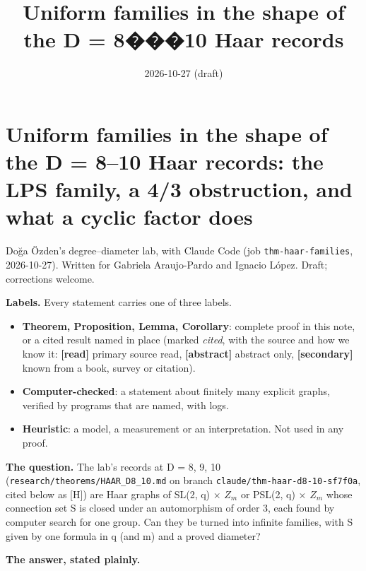\documentclass[
  10pt,
]{article}
\title{Uniform families in the shape of the D = 8���10 Haar records}
\author{}
\date{2026-10-27 (draft)}
\providecommand{\tightlist}{%
  \setlength{\itemsep}{0pt}\setlength{\parskip}{0pt}}
\begin{document}
\maketitle

\hypertarget{uniform-families-in-the-shape-of-the-d-810-haar-records-the-lps-family-a-43-obstruction-and-what-a-cyclic-factor-does}{%
\section{Uniform families in the shape of the D = 8--10 Haar records:
the LPS family, a 4/3 obstruction, and what a cyclic factor
does}\label{uniform-families-in-the-shape-of-the-d-810-haar-records-the-lps-family-a-43-obstruction-and-what-a-cyclic-factor-does}}

Doğa Özden's degree--diameter lab, with Claude Code (job
\texttt{thm-haar-families}, 2026-10-27). Written for Gabriela
Araujo-Pardo and Ignacio López. Draft; corrections welcome.

\textbf{Labels.} Every statement carries one of three labels.

\begin{itemize}
\tightlist
\item
  \textbf{Theorem, Proposition, Lemma, Corollary}: complete proof in
  this note, or a cited result named in place (marked \emph{cited}, with
  the source and how we know it: \textbf{{[}read{]}} primary source
  read, \textbf{{[}abstract{]}} abstract only, \textbf{{[}secondary{]}}
  known from a book, survey or citation).
\item
  \textbf{Computer-checked}: a statement about finitely many explicit
  graphs, verified by programs that are named, with logs.
\item
  \textbf{Heuristic}: a model, a measurement or an interpretation. Not
  used in any proof.
\end{itemize}

\textbf{The question.} The lab's records at D = 8, 9, 10
(\texttt{research/theorems/HAAR\_D8\_10.md} on branch
\texttt{claude/thm-haar-d8-10-sf7f0a}, cited below as {[}H{]}) are Haar
graphs of SL(2, q) × \(Z_{m}\) or PSL(2, q) × \(Z_{m}\) whose connection
set S is closed under an automorphism of order 3, each found by computer
search for one group. Can they be turned into infinite families, with S
given by one formula in q (and m) and a proved diameter?

\textbf{The answer, stated plainly.}
\end{document}
